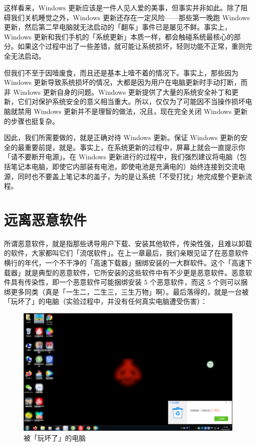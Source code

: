 这样看来，Windows 更新应该是一件人见人爱的美事，但事实并非如此。除了阻碍我们关机睡觉之外，Windows 更新还存在一定风险——那些第一晚跑 Windows 更新，然后第二早电脑就无法启动的「翻车」事件已是屡见不鲜。事实上，Windows 更新和我们手机的「系统更新」本质一样，都会触碰系统最核心的部分。如果这个过程中出了一些差错，就可能让系统损坏，轻则功能不正常，重则完全无法启动。

但我们不至于因噎废食，而且还是基本上噎不着的情况下。事实上，那些因为 Windows 更新导致系统损坏的情况，大都是因为用户在电脑更新时手动打断，而非 Windows 更新自身的问题。Windows 更新提供了大量的系统安全补丁和更新，它们对保护系统安全的意义相当重大。所以，仅仅为了可能因不当操作损坏电脑就禁用 Windows 更新并不是理智的做法，况且，现在完全关闭 Windows 更新的步骤也挺复杂。

因此，我们所需要做的，就是正确对待 Windows 更新。保证 Windows 更新的安全的最重要前提，就是。事实上，在系统更新的过程中，屏幕上就会一直提示你「请不要断开电源」。在 Windows 更新进行的过程中，我们强烈建议将电脑（包括笔记本电脑，即使它内部装有电池，即使电池是充满电的）始终连接到交流电源，同时也不要盖上笔记本的盖子，为的是让系统「不受打扰」地完成整个更新流程。

\section{远离恶意软件}

所谓恶意软件，就是指那些诱导用户下载、安装其他软件，传染性强，且难以卸载的软件，大家都叫它们「流氓软件」。在上一章最后，我们亲眼见证了在恶意软件横行的年代，一个不干净的「高速下载器」捆绑安装的一大群软件。这个「高速下载器」就是典型的恶意软件，它所安装的这些软件中有不少更是恶意软件。恶意软件具有传染性，即一个恶意软件可能捆绑安装 5 个恶意软件，而这 5 个则可以捆绑更多同类（真是「一生二，二生三，三生万物」啊）。最后落得的，就是一台被「玩坏了」的电脑（实验过程中，并没有任何真实电脑遭受伤害）：

\begin{figure}[htb!]
  \centering
  \includegraphics[width=.8\textwidth]{assets/basic/Computer_with_unwanted_software.png}
  \caption{被「玩坏了」的电脑}
  \label{fig:Computer_with_unwanted_software2}
\end{figure}

